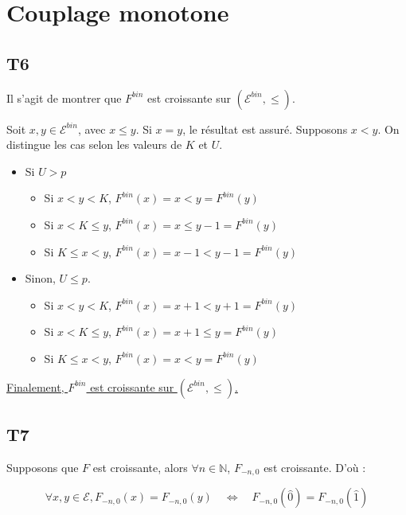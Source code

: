 \documentclass[a4paper,11pt]{article}
\def \E{\mathcal{E}}
\begin{document}
\section{Couplage monotone}

\subsection*{T6}

Il s'agit de montrer que $F^{bin}$ est croissante sur $(\E^{bin},\le)$.

Soit $x,y \in \E^{bin}$, avec $x\le y$. Si $x=y$, le résultat est assuré. Supposons $x<y$. On distingue les cas selon les valeurs de $K$ et $U$. 
\vspace{0.5cm}

\begin{itemize}
\item[\textbullet] Si $U>p$
	\begin{itemize}
	\item Si $x<y<K$, $F^{bin}(x) = x < y = F^{bin}(y)$
	\item Si $x<K\le y$, $F^{bin}(x) = x \le y-1 = F^{bin}(y)$
	\item Si $K\le x < y$, $F^{bin}(x) = x - 1 < y - 1 = F^{bin}(y)$
	\end{itemize}
\item[\textbullet] Sinon, $U\le p$.
	\begin{itemize}
	\item Si $x<y<K$, $F^{bin}(x) = x + 1 < y + 1= F^{bin}(y)$
	\item Si $x<K\le y$, $F^{bin}(x) = x +1 \le y = F^{bin}(y)$
	\item Si $K\le x < y$, $F^{bin}(x) = x < y = F^{bin}(y)$
	\end{itemize}
\end{itemize}

\begin{center}
 \underline{Finalement, $F^{bin}$ est croissante sur  $(\E^{bin},\le)$.}
\end{center}

\subsection*{T7}
Supposons que $F$ est croissante, alors $\forall n \in \mathbb{N}$, $F_{-n,0}$ est croissante. D'où :


 \[\forall x,y \in \E, F_{-n,0}(x)=F_{-n,0}(y)\quad \iff \quad F_{-n,0}(\hat{0})=F_{-n,0}(\hat{1})\]
\end{document}
